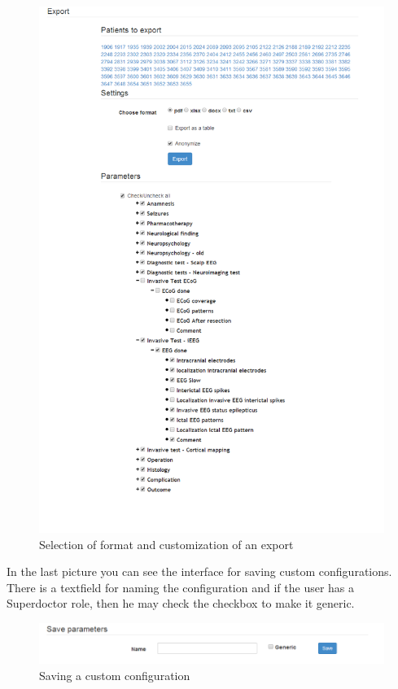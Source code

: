 \documentclass[thesis=B,english]{FITthesis}[2012/10/20]
\begin{document}
\begin{figure}
	\centering
 	\includegraphics[width=1\textwidth]{images/export.png}
 	\caption{Selection of format and customization of an export}
 	\label{fig:export}
\end{figure}


In the last picture you can see the interface for saving custom configurations. There is a textfield for naming the configuration and if the user has a Superdoctor role, then he may check the checkbox to make it generic.

\begin{figure}
	\centering
 	\includegraphics[width=1\textwidth]{images/save.png}
 	\caption{Saving a custom configuration}
 	\label{fig:save}
\end{figure}
\end{document}
